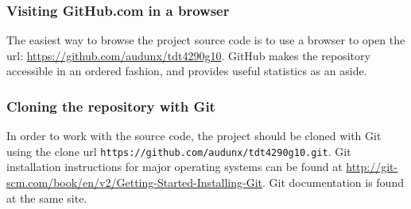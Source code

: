 \documentclass[../document.tex]{subfiles}
\begin{document}
\subsubsection{Visiting GitHub.com in a browser}
The easiest way to browse the project source code is to use a browser to open the url: \url{https://github.com/audunx/tdt4290g10}. GitHub makes the repository accessible in an ordered fashion, and provides useful statistics as an aside.

\subsubsection{Cloning the repository with Git}
In order to work with the source code, the project should be cloned with Git using the clone url \texttt{https://github.com/audunx/tdt4290g10.git}. Git installation instructions for major operating systems can be found at \url{http://git-scm.com/book/en/v2/Getting-Started-Installing-Git}. Git documentation is found at the same site.
\end{document}
